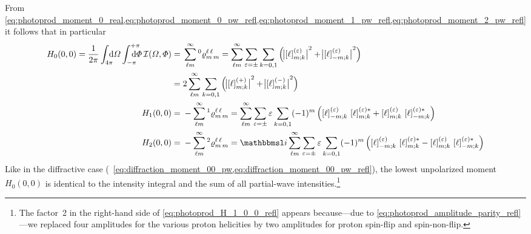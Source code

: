 From
\cref{eq:photoprod_moment_0_real,eq:photoprod_moment_0_pw_refl,eq:photoprod_moment_1_pw_refl,eq:photoprod_moment_2_pw_refl}
it follows that in particular
\begin{align}
  H_0(0, 0)
  = \frac{1}{2 \pi} \int_{4 \pi}\!\!\!\! \dif{\Omega} \int_{-\pi}^{+\pi}\hspace{-1.2em} \dif{\Phi}\,
  \intensity(\Omega, \Phi)
  ={}& \sum_{\ell m}^\infty \prescript{0}{}{\varrho}^{\ell\, \ell}_{m\, m}
  = \sum_{\ell m}^\infty \sum_{\refl = \pm} \sum_{k = 0, 1}
  \rBrk[2]{\Abs[1]{\sBrk{\ell}^{(\refl)}_{m; k}}^2 + \Abs[1]{\sBrk{\ell}^{(\refl)}_{{-m}; k}}^2} \nonumber
  \\
  \label{eq:photoprod_H_1_0_0_refl}
  ={}& 2 \sum_{\ell m}^\infty \sum_{k = 0, 1}
  \rBrk[2]{\Abs[1]{\sBrk{\ell}^{(+)}_{m; k}}^2 + \Abs[1]{\sBrk{\ell}^{(-)}_{m; k}}^2}
  \\
  H_1(0, 0)
  ={}& -\sum_{\ell m}^\infty \prescript{1}{}{\varrho}^{\ell\, \ell}_{m\, m}
  = \sum_{\ell m}^\infty \sum_{\refl = \pm} \refl \sum_{k = 0, 1}
  (-1)^m \rBrk[2]{\sBrk{\ell}^{(\refl)}_{{-m}; k}\, \sBrk{\ell}^{(\refl) *}_{m; k}
  + \sBrk{\ell}^{(\refl)}_{m; k}\, \sBrk{\ell}^{(\refl) *}_{{-m}; k}}
  \\
  H_2(0, 0)
  ={}& -\sum_{\ell m}^\infty \prescript{2}{}{\varrho}^{\ell\, \ell}_{m\, m}
  = \imag \sum_{\ell m}^\infty \sum_{\refl = \pm} \refl \sum_{k = 0, 1}
  (-1)^m \rBrk[2]{\sBrk{\ell}^{(\refl)}_{{-m}; k}\, \sBrk{\ell}^{(\refl) *}_{m; k}
  - \sBrk{\ell}^{(\refl)}_{m; k}\, \sBrk{\ell}^{(\refl) *}_{{-m}; k}}
\end{align}
Like in the diffractive case (\confer\
\cref{eq:diffraction_moment_00_pw,eq:diffraction_moment_00_pw_refl}),
the lowest unpolarized moment $H_0(0, 0)$ is identical to the
intensity integral and the sum of all partial-wave
intensities.\footnote{The factor~2 in the right-hand side of
\cref{eq:photoprod_H_1_0_0_refl} appears because---due to
\cref{eq:photoprod_amplitude_parity_refl}---we replaced four
amplitudes for the various proton helicities by two amplitudes for
proton spin-flip and spin-non-flip.}

